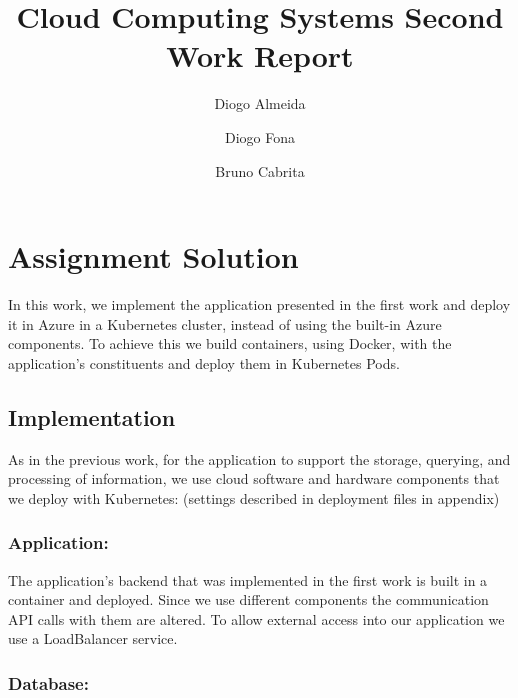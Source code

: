 \documentclass[runningheads]{llncs}
\begin{document}
%
\title{Cloud Computing Systems Second Work Report}
%
%
\author{Diogo Almeida \and
Diogo Fona \and
Bruno Cabrita}
%
%
%
\maketitle %
%
\section{Assignment Solution}

In this work, we implement the application presented in the first work and deploy it in Azure in a Kubernetes cluster, instead of using the built-in Azure components. To achieve this we build containers, using Docker, with the application's constituents and deploy them in Kubernetes Pods. 


\subsection{Implementation}

As in the previous work, for the application to support the storage, querying, and processing of information, we use cloud software and hardware components that we deploy with Kubernetes: (settings described in deployment files in appendix)

\subsubsection{Application:}

The application's backend that was implemented in the first work is built in a container and deployed. Since we use different components the communication API calls with them are altered. To allow external access into our application we use a LoadBalancer service.

\subsubsection{Database:}
\end{document}
